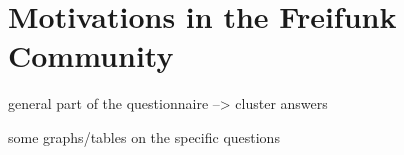 \section{Motivations in the Freifunk Community}

general part of the questionnaire
--> cluster answers

some graphs/tables on the specific questions

\begin{comment}
* is the focus of the paper;

* only pull up the foss motivations as comparison to underline similarities and differences with the foundings here

* find a suitable neat form for presenting the foundings
\end{comment}

\begin{comment}
Demographics:

gender:
* 2f
* 14m

hintergrund:
* alle: technische Berufe/Informatik;
* 3 Menschen studieren noch;
* 5 arbeiten auf dem Gebiet Netzwerke (eine Person ist nach/über Freifunk dazu gekommen)

wie lange dabei
* in den letzten 2 Jahren angefangen: 7 Personen
* seit ~3 Jahren: 5 Personen
* 1 Person: 2004-2008
* $> 8$ Jahre: 3 Personen

community

* Berlin: 9
* Rheinland: 3
* Hannover: 1
* Bremen: 1
* Bielefeld: 1
* Hamburg: 1
\end{comment}

